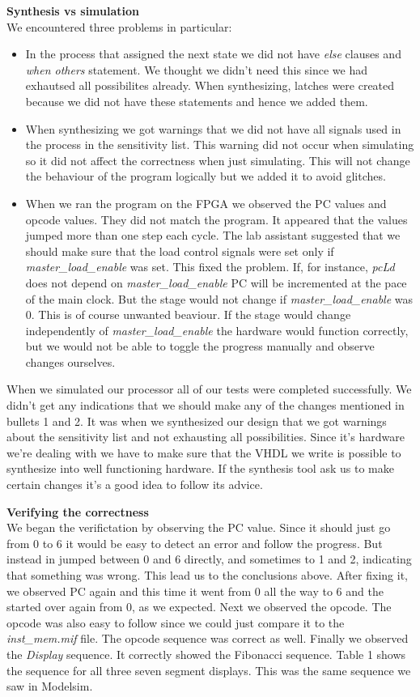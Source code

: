 \documentclass[a4paper,11pt]{article}
\begin{document}
\textbf{Synthesis vs simulation}\\
We encountered three problems in particular:
\begin{itemize}
  \item In the process that assigned the next state we did not have \textit{else} clauses and \textit{when others} statement. We thought we didn't need this since we had exhautsed all possibilites already. When synthesizing, latches were created because we did not have these statements and hence we added them.
  \item When synthesizing we got warnings that we did not have all signals used in the process in the sensitivity list. This warning did not occur when simulating so it did not affect the correctness when just simulating. This will not change the behaviour of the program logically but we added it to avoid glitches.
  \item When we ran the program on the FPGA we observed the PC values and opcode values. They did not match the program. It appeared that the values jumped more than one step each cycle. The lab assistant suggested that we should make sure that the load control signals were set only if \textit{master\_load\_enable} was set. This fixed the problem. If, for instance, \textit{pcLd} does not depend on \textit{master\_load\_enable} PC will be incremented at the pace of the main clock. But the stage would not change if \textit{master\_load\_enable} was 0. This is of course unwanted beaviour. If the stage would change independently of \textit{master\_load\_enable} the hardware would function correctly, but we would not be able to toggle the progress manually and observe changes ourselves.
\end{itemize}

When we simulated our processor all of our tests were completed successfully. We didn't get any indications that we should make any of the changes mentioned in bullets 1 and 2. It was when we synthesized our design that we got warnings about the sensitivity list and not exhausting all possibilities. Since it's hardware we're dealing with we have to make sure that the VHDL we write is possible to synthesize into well functioning hardware. If the synthesis tool ask us to make certain changes it's a good idea to follow its advice. 

\textbf{Verifying the correctness}\\

We began the verifictation by observing the PC value. Since it should just go from 0 to 6 it would be easy to detect an error and follow the progress. But instead in jumped between 0 and 6 directly, and sometimes to 1 and 2, indicating that something was wrong. This lead us to the conclusions above. After fixing it, we observed PC again and this time it went from 0 all the way to 6 and the started over again from 0, as we expected. Next we observed the opcode. The opcode was also easy to follow since we could just compare it to the \textit{inst\_mem.mif} file. The opcode sequence was correct as well. Finally we observed the \textit{Display} sequence. It correctly showed the Fibonacci sequence. Table 1 shows the sequence for all three seven segment displays. This was the same sequence we saw in Modelsim.
\end{document}
